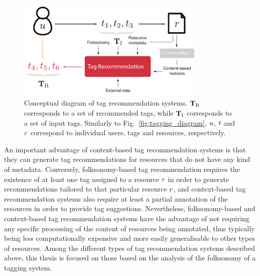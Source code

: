 \begin{figure}[t]
  \centering
  \includegraphics[width=0.8\textwidth]{ch01_introduction/pics/tagging_recommendation_diagram}
  \caption[Conceptual diagram of tag recommendation systems]{Conceptual diagram of tag recommendation systems. $\mathbf{T}_{\text{R}}$ corresponds to a set of recommended tags, while $\mathbf{T}_{\text{I}}$ corresponds to a set of input tags. Similarly to Fig.~\ref{fig:tagging_diagram}, $u$, $t$ and $r$ correspond to individual users, tags and resources, respectively.}
  \label{fig:tag_recommendation_diagram}
\end{figure}
An important advantage of content-based tag recommendation systems is that they can generate tag recommendations for resources that do not have any kind of metadata. Conversely, folksonomy-based tag recommendation requires the existence of at least one tag assigned to a resource $r$ in order to generate recommendations tailored to that particular resource $r$, and context-based tag recommendation systems also require at least a partial annotation of the resources in order to provide tag suggestions.
Nevertheless, folksonomy-based and context-based tag recommendation systems have the advantage of not requiring any specific processing of the content of resources being annotated, thus typically being less computationally expensive and more easily generalisable to other types of resources.
Among the different types of tag recommendation systems described above, this thesis is focused on those based on the analysis of the folksonomy of a tagging system.


